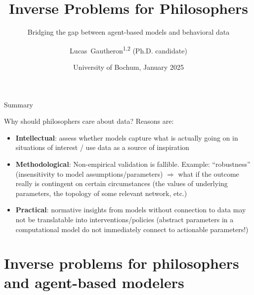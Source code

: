 \documentclass[10pt]{beamer}
\title[Inverse Problems for Philosophers] %
{
Inverse Problems for Philosophers
}
\subtitle{Bridging the gap between agent-based models and behavioral data}
\author[L.~Gautheron]
{Lucas~Gautheron\textsuperscript{1,2} (Ph.D. candidate)
}
\institute[IZWT, ENS] %
{
  \inst{1}
  Interdisciplinary Center for Science and Technology Studies, Wuppertal\\
  \inst{2} Département d'Études Cognitives, École Normale Supérieure, Paris
}
\date[24/01/2025] %
{University of Bochum, January 2025}
\begin{document}
\frame{
\titlepage
}

\begin{frame}{Summary}
    \tableofcontents
\end{frame}

\begin{frame}{Why should philosophers care about data?}
Reasons are:
    \begin{itemize}
        \item<1-> \textbf{Intellectual}: assess whether models capture what is actually going on in situations of interest / use data as a source of inspiration
        \item<2-> \textbf{Methodological}: Non-empirical validation is fallible. Example: ``robustness'' (insensitivity to model assumptions/parameters) $\Rightarrow$ what if the outcome really is contingent on certain circumstances (the values of underlying parameters, the topology of some relevant network, etc.)
        \item<3-> \textbf{Practical}: normative insights from models without connection to data may not be translatable into interventions/policies (abstract parameters in a computational model do not immediately connect to actionable parameters!)
    \end{itemize}
\end{frame}




\section{Inverse problems for philosophers and agent-based modelers}
\end{document}
